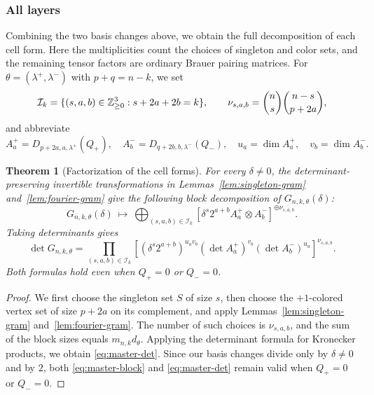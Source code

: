 \documentclass[11pt,a4paper]{amsart}
\newtheorem{theorem}{Theorem}[section]
\theoremstyle{uprightdefinition}
\theoremstyle{remark}\newtheorem{remark}[theorem]{Remark}
\begin{document}
\subsubsection{All layers}
Combining the two basis changes above, we obtain the full decomposition of each cell form.
Here the multiplicities count the choices of singleton and color sets,
and the remaining tensor factors are ordinary Brauer pairing matrices.
For $\theta=(\lambda^+,\lambda^-)$ with $p+q=n-k$, we set
\[
 \mathcal I_k=\{(s,a,b)\in\mathbb Z_{\ge0}^3:s+2a+2b=k\},\qquad
 \nu_{s,a,b}=\binom ns\binom{n-s}{p+2a},
\]
and abbreviate
\[
 A_a^+=D_{p+2a,a,\lambda^+}(Q_+),\quad
 A_b^-=D_{q+2b,b,\lambda^-}(Q_-),\quad
 u_a=\dim A_a^+,\quad v_b=\dim A_b^-.
\]
\begin{theorem}[Factorization of the cell forms]\label{thm:master-gram}
For every $\delta\ne0$, the determinant-preserving invertible transformations in Lemmas~\ref{lem:singleton-gram} and~\ref{lem:fourier-gram} give the following block decomposition of $G_{n,k,\theta}(\delta)$:
\begin{equation}\label{eq:master-block}
 G_{n,k,\theta}(\delta)\ \longmapsto\
 \bigoplus_{(s,a,b)\in\mathcal I_k}
  [\delta^s2^{a+b}A_a^+\otimes A_b^-]^{\oplus\nu_{s,a,b}}.
\end{equation}
Taking determinants gives
\begin{equation}\label{eq:master-det}
 \det G_{n,k,\theta}
 =\prod_{(s,a,b)\in\mathcal I_k}
 \left[(\delta^s2^{a+b})^{u_av_b}
       (\det A_a^+)^{v_b}(\det A_b^-)^{u_a}\right]^{\nu_{s,a,b}}.
\end{equation}
Both formulas hold even when $Q_+=0$ or $Q_-=0$.
\end{theorem}
\begin{proof}
We first choose the singleton set $S$ of size $s$, then choose the $+1$-colored vertex set of size $p+2a$ on its complement,
and apply Lemmas~\ref{lem:singleton-gram} and~\ref{lem:fourier-gram}. The number of such choices is $\nu_{s,a,b}$, and the sum of the block sizes equals $m_{n,k}d_\theta$.
Applying the determinant formula for Kronecker products, we obtain \eqref{eq:master-det}.
Since our basis changes divide only by $\delta\ne0$ and by $2$, both \eqref{eq:master-block} and \eqref{eq:master-det} remain valid when $Q_+=0$ or $Q_-=0$.
\end{proof}
\end{document}
